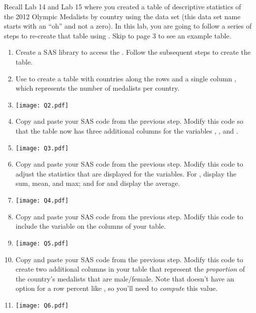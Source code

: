 


\vskip10pt

\noindent Recall Lab 14 and Lab 15 where you created a table of descriptive statistics of the 2012 Olympic Medalists by country using the  data set (this data set name starts with an ``oh'' and not a zero).  In this lab, you are going to follow a series of steps to re-create that table using .  Skip to page 3 to see an example table.
 \begin{enumerate}
\item Create a SAS library to access the .  Follow the subsequent steps to create the table.
\item Use  to create a table with countries along the rows and a single column , which represents the number of medalists per country.
\item[] \texttt{[image: Q2.pdf]}
\item Copy and paste your SAS code from the previous step.  Modify this code so that the table now has three additional columns for the variables , , and .
\item[] \texttt{[image: Q3.pdf]}
\item Copy and paste your SAS code from the previous step.  Modify this code to adjust the statistics that are displayed for the variables.  For , display the sum, mean, and max; and for  and  display the average.
\item[] \texttt{[image: Q4.pdf]}
\item Copy and paste your SAS code from the previous step.  Modify this code to include the variable  on the columns of your table.
\item[] \texttt{[image: Q5.pdf]}
\item Copy and paste your SAS code from the previous step.  Modify this code to create two additional columns in your table that represent the \emph{proportion} of the country's medalists that are male/female.  Note that  doesn't have an option for a row percent like , so you'll need to \emph{compute} this value.  
\item[] \texttt{[image: Q6.pdf]}

\end{enumerate}
